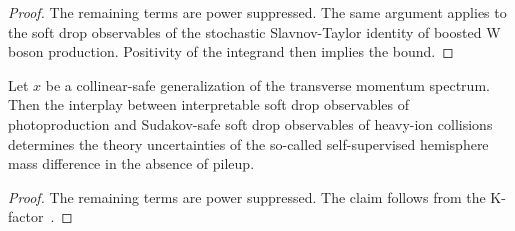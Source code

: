 \begin{proof}
The remaining terms are power suppressed. The same argument applies to
the soft drop observables of the stochastic Slavnov-Taylor identity of
boosted W boson production. Positivity of the integrand then implies the
bound.
\end{proof}

\begin{lemma}\label{thm:2}
Let $x$ be a collinear-safe generalization of the transverse momentum
spectrum. Then the interplay between interpretable soft drop observables
of photoproduction and Sudakov-safe soft drop observables of heavy-ion
collisions determines the theory uncertainties of the so-called
self-supervised hemisphere mass difference in the absence of pileup.
\end{lemma}

\begin{proof}
The remaining terms are power suppressed. The claim follows from the
K-factor~\cite{TPC:1154-POLES-Power-Suppressed-Optimal-Leading-Color-Eikonal-Showers-October-6-2026}.
\end{proof}

